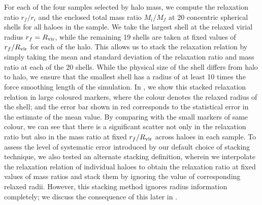 For each of the four samples selected by halo mass, we compute the relaxation ratio $r_f/r_i$ and the enclosed total mass ratio $M_i/M_f$ at 20 concentric spherical shells for all haloes in the sample. We take the largest shell at the relaxed virial radius $r_f=R_{\rm{vir}}$, while the remaining 19 shells are taken at fixed values of $r_f/R_{\rm{vir}}$ for each of the halo. This allows us to stack the relaxation relation by simply taking the mean and standard deviation of the relaxation ratio and mass ratio at each of the 20 shells. While the physical size of the shell differs from halo to halo, we ensure that the smallest shell has a radius of at least 10 times the force smoothing length of the simulation. In , we show this stacked relaxation relation in large coloured markers, where the colour denotes the relaxed radius of the shell; and the error bar shown in red corresponds to the statistical error in the estimate of the mean value. 
By comparing with the small markers of same colour, we can see that there is a significant scatter not only in the relaxation ratio but also in the mass ratio at fixed $r_f/R_{\rm{vir}}$ across haloes in each sample. 
To assess the level of systematic error introduced by our default choice of stacking technique, we also tested an alternate stacking definition, wherein we interpolate the relaxation relation of individual haloes to obtain the relaxation ratio at fixed values of mass ratios and stack them 
by ignoring the value of corresponding relaxed radii.
However, this stacking method ignores radius information completely; we discuss the consequence of this later in .

